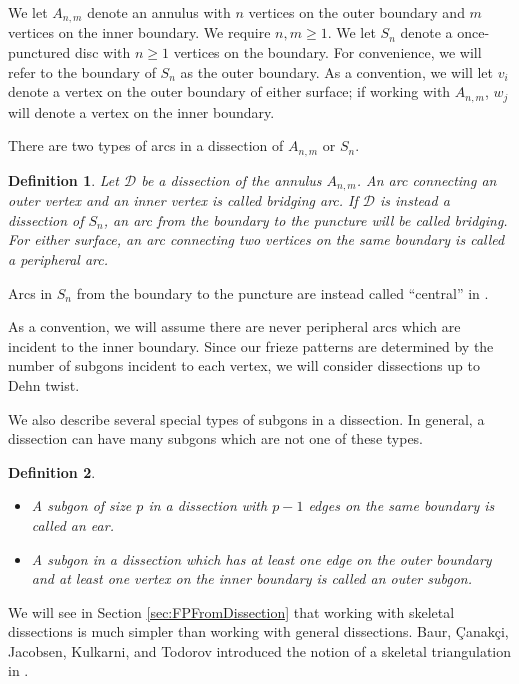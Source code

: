 \documentclass[12pt]{article}
\newtheorem{definition}{Definition}
\theoremstyle{remark}
\newcommand*{\D}{\mathcal{D}}
\begin{document}
We let $A_{n,m}$ denote an annulus with $n$ vertices on the outer boundary and $m$ vertices on the inner boundary. We require $n, m \geq 1$. We let $S_n$ denote a once-punctured disc with $n \geq 1$ vertices on the boundary. For convenience, we will refer to the boundary of $S_n$ as the outer boundary. As a convention, we will let $v_i$ denote a vertex on the outer boundary of either surface; if working with $A_{n,m}$, $w_j$ will denote a vertex on the inner boundary. 

There are two types of arcs in a dissection of $A_{n,m}$ or $S_n$.

\begin{definition}\label{def:bridgingandperipheralarcs}
Let $\D$ be a dissection of the annulus $A_{n,m}$. An arc connecting an outer vertex and an inner vertex is called \emph{bridging arc}. If $\D$ is instead a dissection of $S_n$, an arc from the boundary to the puncture will be called \emph{bridging}. For either surface, an arc connecting two vertices on the same boundary is called a \emph{peripheral arc}. 
\end{definition}

Arcs in $S_n$ from the boundary to the puncture are instead called ``central'' in \cite{1}.

As a convention, we will assume there are never peripheral arcs which are incident to the inner boundary. Since our frieze patterns are determined by the number of subgons incident to each vertex, we will consider dissections up to Dehn twist.

We also describe several special types of subgons in a dissection. In general, a dissection can have many subgons which are not one of these types. 

\begin{definition}\label{def:typesofsubgons}
\begin{itemize}
    \item A subgon of size $p$ in a dissection with $p-1$ edges on the same boundary is called an \emph{ear}.
    \item A subgon in a dissection which has at least one edge on the outer boundary and at least one vertex on the inner boundary is called an \emph{outer subgon}. 
\end{itemize}
\end{definition}

We will see in Section \ref{sec:FPFromDissection} that working with skeletal dissections is much simpler than working with general dissections. Baur, \c{C}anak\c{c}i, Jacobsen, Kulkarni, and Todorov introduced the notion of a skeletal triangulation in \cite{3}. 
\end{document}
